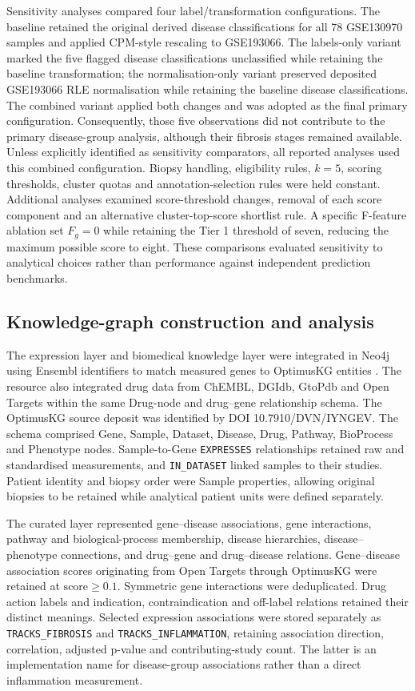 \documentclass[11pt,a4paper]{article}
\begin{document}
Sensitivity analyses compared four label/transformation configurations. The baseline retained the original derived disease classifications for all 78 GSE130970 samples and applied CPM-style rescaling to GSE193066. The labels-only variant marked the five flagged disease classifications unclassified while retaining the baseline transformation; the normalisation-only variant preserved deposited GSE193066 RLE normalisation while retaining the baseline disease classifications. The combined variant applied both changes and was adopted as the final primary configuration. Consequently, those five observations did not contribute to the primary disease-group analysis, although their fibrosis stages remained available. Unless explicitly identified as sensitivity comparators, all reported analyses used this combined configuration. Biopsy handling, eligibility rules, \(k=5\), scoring thresholds, cluster quotas and annotation-selection rules were held constant. Additional analyses examined score-threshold changes, removal of each score component and an alternative cluster-top-score shortlist rule. A specific F-feature ablation set \(F_g=0\) while retaining the Tier 1 threshold of seven, reducing the maximum possible score to eight. These comparisons evaluated sensitivity to analytical choices rather than performance against independent prediction benchmarks.

\subsection*{Knowledge-graph construction and analysis}
The expression layer and biomedical knowledge layer were integrated in Neo4j using Ensembl identifiers to match measured genes to OptimusKG entities \cite{ref5}. The resource also integrated drug data from ChEMBL, DGIdb, GtoPdb and Open Targets within the same Drug-node and drug--gene relationship schema. The OptimusKG source deposit was identified by DOI 10.7910/DVN/IYNGEV. The schema comprised Gene, Sample, Dataset, Disease, Drug, Pathway, BioProcess and Phenotype nodes. Sample-to-Gene \texttt{EXPRESSES} relationships retained raw and standardised measurements, and \texttt{IN\_DATASET} linked samples to their studies. Patient identity and biopsy order were Sample properties, allowing original biopsies to be retained while analytical patient units were defined separately.

The curated layer represented gene--disease associations, gene interactions, pathway and biological-process membership, disease hierarchies, disease--phenotype connections, and drug--gene and drug--disease relations. Gene--disease association scores originating from Open Targets through OptimusKG were retained at \(\mathrm{score}\geq0.1\). Symmetric gene interactions were deduplicated. Drug action labels and indication, contraindication and off-label relations retained their distinct meanings. Selected expression associations were stored separately as \texttt{TRACKS\_FIBROSIS} and \texttt{TRACKS\_INFLAMMATION}, retaining association direction, correlation, adjusted p-value and contributing-study count. The latter is an implementation name for disease-group associations rather than a direct inflammation measurement. 
\end{document}
